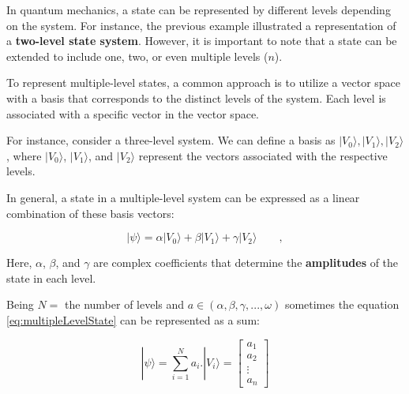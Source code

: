 			\par In quantum mechanics, a state can be represented by different levels depending on the system. For instance, the previous example illustrated a representation of a \textbf{two-level state system}. However, it is important to note that a state can be extended to include one, two, or even multiple levels ($n$).\newline
			
			\par To represent multiple-level states, a common approach is to utilize a vector space with a basis that corresponds to the distinct levels of the system. Each level is associated with a specific vector in the vector space.\newline
			
			\par For instance, consider a three-level system. We can define a basis as ${|V_0\rangle, |V_1\rangle, |V_2\rangle}$, where $|V_0\rangle$, $|V_1\rangle$, and $|V_2\rangle$ represent the vectors associated with the respective levels.
			
			\par In general, a state in a multiple-level system can be expressed as a linear combination of these basis vectors:
			
			\begin{equation}
				|\psi\rangle = \alpha |V_0\rangle + \beta |V_1\rangle + \gamma |V_2\rangle \qquad,
				\label{eq:multipleLevelState}
			\end{equation}
		
			\par Here, $\alpha$, $\beta$, and $\gamma$ are complex coefficients that determine the \textbf{amplitudes} of the state in each level.\newline
			
			\par Being $N=$ the number of levels and $a \in (\alpha, \beta, \gamma, ... , \omega)$ sometimes the equation \ref{eq:multipleLevelState} can be represented as a sum:
			
			\begin{equation}
				|\psi\rangle = \sum_{i=1}^{N} a_i . |V_i\rangle = 
				\begin{bmatrix}
					a_{1} \\
					a_{2} \\
					\vdots \\
					a_{n}
				\end{bmatrix}
				\label{eq:multipleLevelStateSum}
			\end{equation}
		
